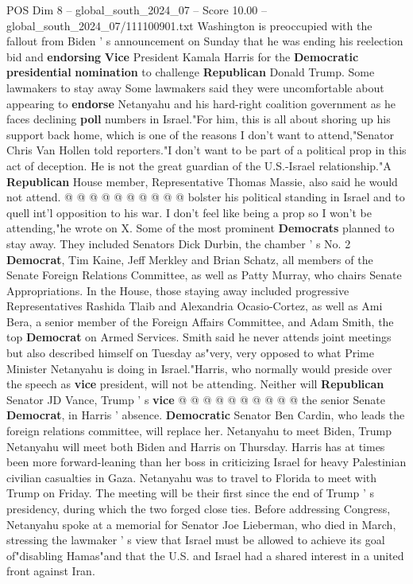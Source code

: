 \begin{textsample}{POS Dim 8 – global\_south\_2024\_07 – Score 10.00 – global\_south\_2024\_07/111100901.txt}
Washington is preoccupied with the fallout from Biden ' s announcement on Sunday that he was ending his reelection bid and \textbf{endorsing} \textbf{Vice} President Kamala Harris for the \textbf{Democratic} \textbf{presidential} \textbf{nomination} to challenge \textbf{Republican} Donald Trump.
Some lawmakers to stay away Some lawmakers said they were uncomfortable about appearing to \textbf{endorse} Netanyahu and his hard-right coalition government as he faces declining \textbf{poll} numbers in Israel."For him, this is all about shoring up his support back home, which is one of the reasons I don't want to attend,"Senator Chris Van Hollen told reporters."I don't want to be part of a political prop in this act of deception.
He is not the great guardian of the U.S.-Israel relationship."A \textbf{Republican} House member, Representative Thomas Massie, also said he would not attend. @ @ @ @ @ @ @ @ @ @ bolster his political standing in Israel and to quell int'l opposition to his war.
I don't feel like being a prop so I won't be attending,"he wrote on X.
Some of the most prominent \textbf{Democrats} planned to stay away.
They included Senators Dick Durbin, the chamber ' s No. 2 \textbf{Democrat}, Tim Kaine, Jeff Merkley and Brian Schatz, all members of the Senate Foreign Relations Committee, as well as Patty Murray, who chairs Senate Appropriations.
In the House, those staying away included progressive Representatives Rashida Tlaib and Alexandria Ocasio-Cortez, as well as Ami Bera, a senior member of the Foreign Affairs Committee, and Adam Smith, the top \textbf{Democrat} on Armed Services.
Smith said he never attends joint meetings but also described himself on Tuesday as"very, very opposed to what Prime Minister Netanyahu is doing in Israel."Harris, who normally would preside over the speech as \textbf{vice} president, will not be attending.
Neither will \textbf{Republican} Senator JD Vance, Trump ' s \textbf{vice} @ @ @ @ @ @ @ @ @ @ the senior Senate \textbf{Democrat}, in Harris ' absence. \textbf{Democratic} Senator Ben Cardin, who leads the foreign relations committee, will replace her.
Netanyahu to meet Biden, Trump Netanyahu will meet both Biden and Harris on Thursday.
Harris has at times been more forward-leaning than her boss in criticizing Israel for heavy Palestinian civilian casualties in Gaza.
Netanyahu was to travel to Florida to meet with Trump on Friday.
The meeting will be their first since the end of Trump ' s presidency, during which the two forged close ties.
Before addressing Congress, Netanyahu spoke at a memorial for Senator Joe Lieberman, who died in March, stressing the lawmaker ' s view that Israel must be allowed to achieve its goal of"disabling Hamas"and that the U.S. and Israel had a shared interest in a united front against Iran.

\end{textsample}

